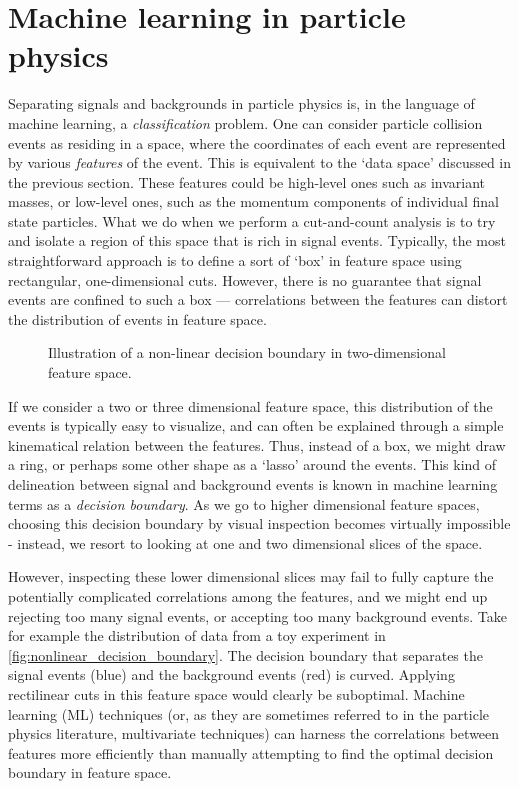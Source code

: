 \section{Machine learning in particle physics}\label{sec:MachineLearning}
Separating signals and backgrounds in particle physics is, in the language of machine learning, a \emph{classification} problem. One can consider particle collision events as residing in a space, where the coordinates of each event are represented by various \emph{features} of the event. This is equivalent to the `data space' discussed in the previous section. These features could be high-level ones such as invariant masses, or low-level ones, such as the momentum components of individual final state particles. What we do when we perform a cut-and-count analysis is to try and isolate a region of this space that is rich in signal events. Typically, the most straightforward approach is to define a sort of `box' in feature space using rectangular, one-dimensional cuts. However, there is no guarantee that signal events are confined to such a box --- correlations between the features can distort the distribution of events in feature space. 
\strictpagecheck
\begin{figure}
  \begin{sidecaption}{Illustration of a non-linear decision boundary in two-dimensional feature space.}
  
\end{sidecaption}
\label{fig:nonlinear_decision_boundary}
\end{figure}
If we consider a two or three dimensional feature space, this distribution of the events is typically easy to visualize, and can often be explained through a simple kinematical relation between the features. Thus, instead of a box, we might draw a ring, or perhaps some other shape as a `lasso' around the events. This kind of delineation between signal and background events is known in machine learning terms as a \emph{decision boundary}. As we go to higher dimensional feature spaces, choosing this decision boundary by visual inspection becomes virtually impossible - instead, we resort to looking at one and two dimensional slices of the space. 

However, inspecting these lower dimensional slices may fail to fully capture the potentially complicated correlations among the features, and we might end up rejecting too many signal events, or accepting too many background events. Take for example the distribution of data from a toy experiment in \autoref{fig:nonlinear_decision_boundary}. The decision boundary that separates the signal events (blue) and the background events (red) is curved. Applying rectilinear cuts in this feature space would clearly be suboptimal. Machine learning (ML) techniques (or, as they are sometimes referred to in the particle physics literature, multivariate techniques) can harness the correlations between features more efficiently than manually attempting to find the optimal decision boundary in feature space.


